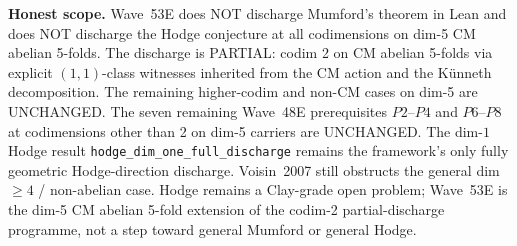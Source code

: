 \begin{remark}
\textbf{Honest scope.} Wave~53E does NOT discharge Mumford's theorem in Lean and does NOT discharge the Hodge conjecture at all codimensions on dim-5 CM abelian 5-folds. The discharge is PARTIAL: codim 2 on CM abelian 5-folds via explicit $(1, 1)$-class witnesses inherited from the CM action and the K\"unneth decomposition. The remaining higher-codim and non-CM cases on dim-5 are UNCHANGED. The seven remaining Wave~48E prerequisites $P2$--$P4$ and $P6$--$P8$ at codimensions other than 2 on dim-5 carriers are UNCHANGED. The dim-$1$ Hodge result \texttt{hodge\_dim\_one\_full\_discharge} remains the framework's only fully geometric Hodge-direction discharge. Voisin~2007 still obstructs the general dim~$\geq 4$ / non-abelian case. Hodge remains a Clay-grade open problem; Wave~53E is the dim-5 CM abelian 5-fold extension of the codim-2 partial-discharge programme, not a step toward general Mumford or general Hodge.
\end{remark}

